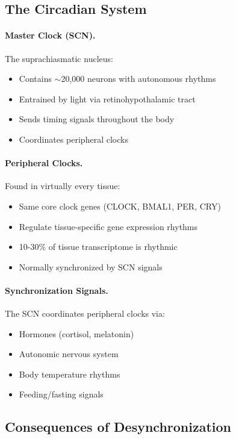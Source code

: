\subsection{The Circadian System}

\paragraph{Master Clock (SCN).} The suprachiasmatic nucleus:
\begin{itemize}
    \item Contains $\sim$20,000 neurons with autonomous rhythms
    \item Entrained by light via retinohypothalamic tract
    \item Sends timing signals throughout the body
    \item Coordinates peripheral clocks
\end{itemize}

\paragraph{Peripheral Clocks.} Found in virtually every tissue:
\begin{itemize}
    \item Same core clock genes (CLOCK, BMAL1, PER, CRY)
    \item Regulate tissue-specific gene expression rhythms
    \item 10-30\% of tissue transcriptome is rhythmic
    \item Normally synchronized by SCN signals
\end{itemize}

\paragraph{Synchronization Signals.} The SCN coordinates peripheral clocks via:
\begin{itemize}
    \item Hormones (cortisol, melatonin)
    \item Autonomic nervous system
    \item Body temperature rhythms
    \item Feeding/fasting signals
\end{itemize}

\subsection{Consequences of Desynchronization}

